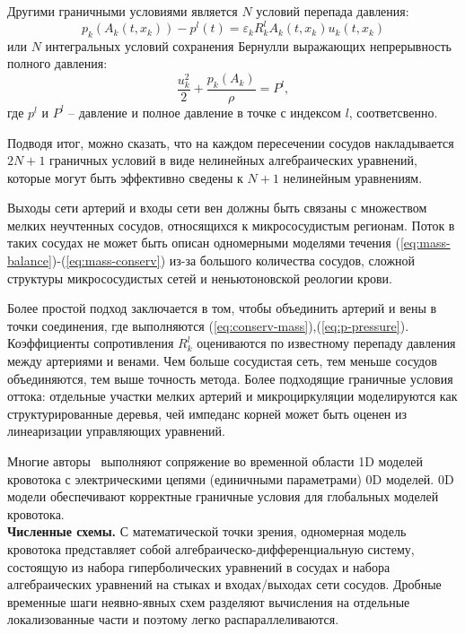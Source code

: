 Другими граничными условиями является $N$ условий перепада давления:
\begin{equation}
    \label{eq:p-pressure}
    p_k\left(A_k\left(t,x_k\right)\right)-p^l(t)=\varepsilon_k R^l_k A_k(t,x_k)u_k(t,x_k)
\end{equation}
или $N$ интегральных условий сохранения Бернулли выражающих непрерывность полного давления:
\begin{equation}
    \label{eq:bernulli}
    \frac{u^2_k}{2}+\frac{p_k(A_k)}{\rho}=P^l,
\end{equation}
где $p^l$ и $P^l$ -- давление и полное давление в точке с индексом $l$, соответсвенно.

Подводя итог, можно сказать, что на каждом пересечении сосудов накладывается $2N + 1 $ граничных условий в виде 
нелинейных алгебраических уравнений, которые могут быть эффективно сведены к $N + 1$ нелинейным уравнениям.

Выходы сети артерий и входы сети вен должны быть связаны с множеством мелких неучтенных сосудов, относящихся к микрососудистым регионам.
 Поток в таких сосудах не может быть описан одномерными моделями течения (\ref{eq:mass-balance})-(\ref{eq:mass-conserv}) 
 из-за большого количества сосудов, сложной структуры микрососудистых сетей и неньютоновской реологии крови.

Более простой подход заключается в том, чтобы объединить артерий и вены в точки соединения, 
где выполняются (\ref{eq:conserv-mass}),(\ref{eq:p-pressure}). Коэффициенты сопротивления $ R^l_k$ оцениваются  по известному перепаду 
давления между артериями и венами. Чем больше сосудистая сеть, тем меньше сосудов объединяются, тем выше точность метода. 
Более подходящие граничные условия оттока: отдельные участки мелких артерий и микроциркуляции моделируются как структурированные деревья, 
чей импеданс корней может быть оценен из линеаризации управляющих уравнений.

Многие авторы~\cite{alastruey:2008} выполняют сопряжение во временной области 1D моделей кровотока с электрическими цепями 
(единичными параметрами) 0D моделей. 0D модели обеспечивают корректные граничные условия для глобальных моделей кровотока.
\\

{\bf Численные схемы.}
С математической точки зрения, одномерная модель кровотока представляет собой алгебраическо-дифференциальную систему, 
состоящую из набора гиперболических уравнений в сосудах и набора алгебраических уравнений на стыках и входах/выходах сети сосудов. 
Дробные временные шаги неявно-явных схем разделяют вычисления на отдельные локализованные части и поэтому легко распараллеливаются.

